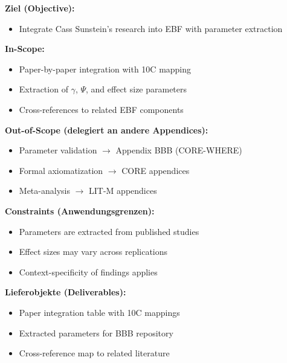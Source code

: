 
\begin{tcolorbox}[
    colback=orange!5!white,
    colframe=orange!75!black,
    title={\textbf{Appendix Scope: Ziel / In-Scope / Out-of-Scope / Constraints}},
    fonttitle=\bfseries
]

\textbf{Ziel (Objective):}
\begin{itemize}[nosep]
    \item Integrate Cass Sunstein's research into EBF with parameter extraction
\end{itemize}

\textbf{In-Scope:}
\begin{itemize}[nosep]
    \item Paper-by-paper integration with 10C mapping
    \item Extraction of $\gamma$, $\Psi$, and effect size parameters
    \item Cross-references to related EBF components
\end{itemize}

\textbf{Out-of-Scope (delegiert an andere Appendices):}
\begin{itemize}[nosep]
    \item Parameter validation $\rightarrow$ Appendix BBB (CORE-WHERE)
    \item Formal axiomatization $\rightarrow$ CORE appendices
    \item Meta-analysis $\rightarrow$ LIT-M appendices
\end{itemize}

\textbf{Constraints (Anwendungsgrenzen):}
\begin{itemize}[nosep]
    \item Parameters are extracted from published studies
    \item Effect sizes may vary across replications
    \item Context-specificity of findings applies
\end{itemize}

\textbf{Lieferobjekte (Deliverables):}
\begin{itemize}[nosep]
    \item Paper integration table with 10C mappings
    \item Extracted parameters for BBB repository
    \item Cross-reference map to related literature
\end{itemize}

\end{tcolorbox}

